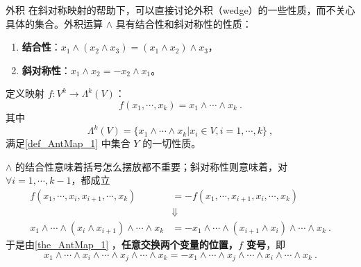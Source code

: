 \begin{example}{外积}\label{ex_AntMap_1}
在斜对称映射的帮助下，可以直接讨论外积（wedge）的一些性质，而不关心具体的集合。外积运算 $\wedge$ 具有结合性和斜对称性的性质：
\begin{enumerate}
\item \textbf{结合性}：$x_1\wedge(x_2\wedge x_3)=(x_1\wedge x_2)\wedge x_3$，
\item \textbf{斜对称性}：$x_1\wedge x_2=-x_2\wedge x_1$。
\end{enumerate}

定义映射 $f:V^k\rightarrow \Lambda^k(V)$：
\begin{equation}
f(x_1,\cdots,x_k)=x_1\wedge\cdots\wedge x_k~.
\end{equation}
其中
\begin{equation}
\Lambda^k(V)=\{x_1\wedge\cdots\wedge x_k| x_i\in V,i=1,\cdots,k\}~,
\end{equation}
满足\autoref{def_AntMap_1} 中集合 $Y$ 的一切性质。

$\wedge$ 的结合性意味着括号怎么摆放都不重要；斜对称性则意味着，对 $\forall i=1,\cdots,k-1$，都成立
\begin{equation}
\begin{aligned}
f(x_1,\cdots,x_i,x_{i+1},\cdots,x_k)&=-f(x_1,\cdots,x_{i+1},x_i,\cdots,x_k)\\
&\Downarrow\\
x_1\wedge\cdots\wedge (x_i\wedge x_{i+1})\wedge\cdots\wedge x_k&=-x_1\wedge\cdots\wedge (x_{i+1}\wedge x_{i})\wedge\cdots\wedge x_k~.
\end{aligned}
\end{equation}
于是由\autoref{the_AntMap_1} ，\textbf{任意交换两个变量的位置，$f$ 变号}，即
\begin{equation}
x_1\wedge\cdots\wedge x_i\wedge\cdots\wedge x_j\wedge\cdots\wedge x_k=-x_1\wedge\cdots\wedge x_j\wedge\cdots\wedge x_i\wedge\cdots\wedge x_k~.
\end{equation}



\end{example}
